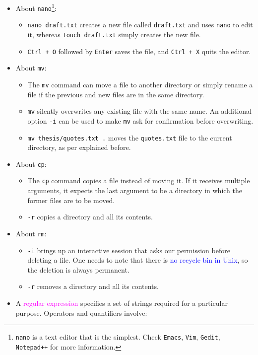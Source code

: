 \documentclass[UTF8]{book}
\newcommand{\code}[1]{\colorbox{codegray}{\texttt{#1}}}
\begin{document}
\begin{itemize}
\begin{itemize}
\end{itemize}
\item About \code{nano}\footnote{\code{nano} is a text editor that is the simplest. Check \code{Emacs}, \code{Vim}, \code{Gedit}, \code{Notepad++} for more information.}:
\begin{itemize}
	\item \code{nano draft.txt} creates a new file called \code{draft.txt} and uses \code{nano} to edit it, whereas \code{touch draft.txt} simply creates the new file.
	\item \code{Ctrl + O} followed by \code{Enter} saves the file, and \code{Ctrl + X} quits the editor.
\end{itemize}
\item About \code{mv}:
\begin{itemize}
	\item The \code{mv} command can move a file to another directory or simply rename a file if the previous and new files are in the same directory.
	\item \code{mv} silently overwrites any existing file with the same name. An additional option \code{-i} can be used to make \code{mv} ask for confirmation before overwriting.
	\item \code{mv thesis/quotes.txt .} moves the \code{quotes.txt} file to the current directory, as per explained before.
\end{itemize}
\item About \code{cp}:
\begin{itemize}
	\item The \code{cp} command copies a file instead of moving it. If it receives multiple arguments, it expects the last argument to be a directory in which the former files are to be moved.
	\item \code{-r} copies a directory and all its contents.
\end{itemize}
\item About \code{rm}:
\begin{itemize}
	\item \code{-i} brings up an interactive session that asks our permission before deleting a file. One needs to note that there is \textcolor{blue}{no recycle bin in Unix}, so the deletion is always permanent.
	\item \code{-r} removes a directory and all its contents.
\end{itemize}
\item A \textcolor{magenta}{regular expression} specifies a set of strings required for a particular purpose. Operators and quantifiers involve:

\end{itemize}
\end{document}
